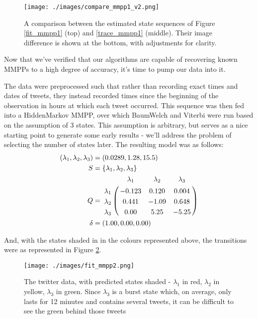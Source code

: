 \begin{figure}[h!]
\centering
\texttt{[image: ./images/compare\_mmpp1\_v2.png]}
\caption{A comparison between the estimated state sequences of Figure \ref{fit_mmpp1} (top) and \ref{trace_mmpp1} (middle). Their image difference is shown at the bottom, with adjustments for clarity.}
\label{compare_mmpp1}
\end{figure}

Now that we've verified that our algorithms are capable of recovering known MMPPs to a high degree of accuracy, it's time to pump our data into it.

The data were preprocessed such that rather than recording exact times and dates of tweets, they instead recorded times since the beginning of the observation in hours at which each tweet occurred. This sequence was then fed into a HiddenMarkov MMPP, over which BaumWelch and Viterbi were run based on the assumption of 3 states. This assumption is arbitrary, but serves as a nice starting point to generate some early results - we'll address the problem of selecting the number of states later. The resulting model was as follows:
\begin{align*}
(\lambda_1,\lambda_2,\lambda_3) &= (0.0289,1.28,15.5)\\
S &= \{\lambda_1,\lambda_2,\lambda_3\}\\
Q &= \bordermatrix{      & \lambda_1 & \lambda_2 & \lambda_3\cr
                \lambda_1 & -0.123 & 0.120 & 0.004 \cr
                \lambda_2 & 0.441 & -1.09 & 0.648 \cr
                \lambda_3 & 0.00 & 5.25 & -5.25 \cr
			}\\
\delta &= (1.00,0.00,0.00)
\end{align*}

And, with the states shaded in in the colours represented above, the transitions were as represented in Figure \ref{fit_mmpp2}.

\begin{figure}[h!]
\centering
\texttt{[image: ./images/fit\_mmpp2.png]}
\caption{The twitter data, with predicted states shaded - $\lambda_1$ in red, $\lambda_2$ in yellow, $\lambda_3$ in green. Since $\lambda_3$ is a burst state which, on average, only lasts for 12 minutes and contains several tweets, it can be difficult to see the green behind those tweets}
\label{fit_mmpp2}
\end{figure}

